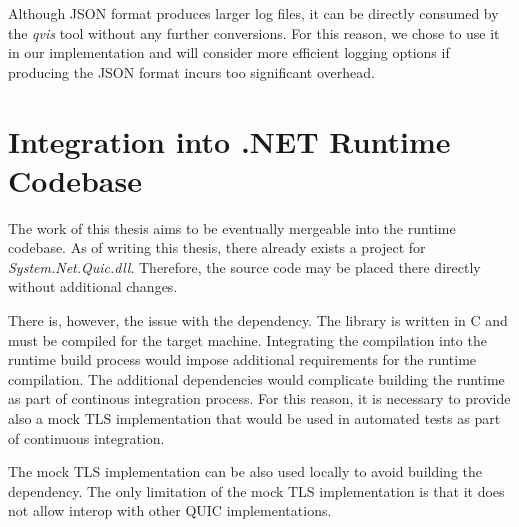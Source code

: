 Although JSON format produces larger log files, it can be directly consumed by the \textit{qvis}
tool without any further conversions. For this reason, we chose to use it in our implementation and
will consider more efficient logging options if producing the JSON format incurs too significant
overhead.

\section{Integration into .NET Runtime Codebase}

The work of this thesis aims to be eventually mergeable into the \dotnet{} runtime codebase. As of
writing this thesis, there already exists a project for \textit{System.Net.Quic.dll}. Therefore, the
source code may be placed there directly without additional changes.

There is, however, the issue with the \libopenssl{} dependency. The \libopenssl{} library is written
in C and must be compiled for the target machine. Integrating the \libopenssl{} compilation into the
\dotnet{} runtime build process would impose additional requirements for the \dotnet{} runtime
compilation. The additional dependencies would complicate building the \dotnet{} runtime as part of
continous integration process. For this reason, it is necessary to provide also a mock TLS
implementation that would be used in automated tests as part of continuous integration.

The mock TLS implementation can be also used locally to avoid building the \libopenssl{} dependency.
The only limitation of the mock TLS implementation is that it does not allow interop with other QUIC
implementations.
